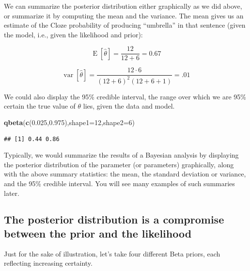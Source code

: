 \documentclass[12pt,]{krantz}
\newenvironment{Shaded}{\begin{snugshade}}{\end{snugshade}}
\newcommand{\DataTypeTok}[1]{\textcolor[rgb]{0.13,0.29,0.53}{#1}}
\newcommand{\DecValTok}[1]{\textcolor[rgb]{0.00,0.00,0.81}{#1}}
\newcommand{\FloatTok}[1]{\textcolor[rgb]{0.00,0.00,0.81}{#1}}
\newcommand{\KeywordTok}[1]{\textcolor[rgb]{0.13,0.29,0.53}{\textbf{#1}}}
\newcommand{\NormalTok}[1]{#1}
\theoremstyle{definition}
\theoremstyle{definition}
\theoremstyle{definition}
\theoremstyle{remark}
\begin{document}
We can summarize the posterior distribution either graphically as we did above, or summarize it by computing the mean and the variance. The mean gives us an estimate of the Cloze probability of producing ``umbrella'' in that sentence (given the model, i.e., given the likelihood and prior):

\begin{equation}
\operatorname{E}[\hat\theta] = \frac{12}{12+6}=0.67
\label{eq:meanPb}
\end{equation}

\begin{equation}
\operatorname{var}[\hat\theta]=\frac {12 \cdot 6 }{(12 + 6 )^{2}(12 + 6 +1)}= .01
\label{eq:varPb}
\end{equation}

We could also display the 95\% credible interval, the range over which we are 95\% certain the true value of \(\theta\) lies, given the data and model.

\begin{Shaded}
\begin{Highlighting}[]
\KeywordTok{qbeta}\NormalTok{(}\KeywordTok{c}\NormalTok{(}\FloatTok{0.025}\NormalTok{,}\FloatTok{0.975}\NormalTok{),}\DataTypeTok{shape1=}\DecValTok{12}\NormalTok{,}\DataTypeTok{shape2=}\DecValTok{6}\NormalTok{)}
\end{Highlighting}
\end{Shaded}

\begin{verbatim}
## [1] 0.44 0.86
\end{verbatim}

Typically, we would summarize the results of a Bayesian analysis by displaying the posterior distribution of the parameter (or parameters) graphically, along with the above summary statistics: the mean, the standard deviation or variance, and the 95\% credible interval. You will see many examples of such summaries later.

\hypertarget{the-posterior-distribution-is-a-compromise-between-the-prior-and-the-likelihood}{%
\subsection{The posterior distribution is a compromise between the prior and the likelihood}\label{the-posterior-distribution-is-a-compromise-between-the-prior-and-the-likelihood}}

Just for the sake of illustration, let's take four different Beta priors, each reflecting increasing certainty.
\end{document}
